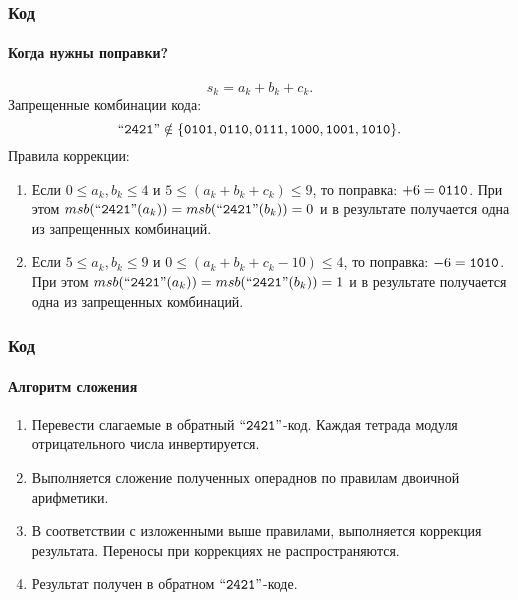 \begin{frame}
    \frametitle{Код \AikenLabel}
    \framesubtitle{Когда нужны поправки?}

    \[
        s_k=a_k+b_k+c_k.
    \]
    Запрещенные комбинации кода:
    \[
        \text{``\texttt{2421}''}\notin\{\texttt{0101},\texttt{0110},\texttt{0111},\texttt{1000},\texttt{1001},\texttt{1010}\}.
    \]
    Правила коррекции:
    \begin{enumerate}
        \item Если $0\leq a_{k},b_{k}\leq 4$ и $5\leq(a_{k}+b_{k}+c_{k})\leq 9$, то поправка: $+6=\texttt{0110}$. 
        При этом $msb(\text{``\texttt{2421}''}(a_k))=msb(\text{``\texttt{2421}''}(b_k))=0$ и в результате получается одна из запрещенных комбинаций.
        
        \item Если $5\leq a_{k},b_{k}\leq 9$ и $0\leq(a_{k}+b_{k}+c_{k}-10)\leq 4$, то поправка: $-6=\texttt{1010}$.
        При этом $msb(\text{``\texttt{2421}''}(a_k))=msb(\text{``\texttt{2421}''}(b_k))=1$ и в результате получается одна из запрещенных комбинаций.
    \end{enumerate}
\end{frame}

\begin{frame}
    \frametitle{Код \AikenLabel}
    \framesubtitle{Алгоритм сложения}
    
    \begin{enumerate}
        \item Перевести слагаемые в обратный $\text{``\texttt{2421}''}$-код. Каждая тетрада модуля отрицательного числа инвертируется.
        \item Выполняется сложение полученных операднов по правилам двоичной арифметики.
        \item В соответствии с изложенными выше правилами, выполняется коррекция результата. Переносы при коррекциях не распространяются.
        \item Результат получен в обратном $\text{``\texttt{2421}''}$-коде.
    \end{enumerate}
\end{frame}

